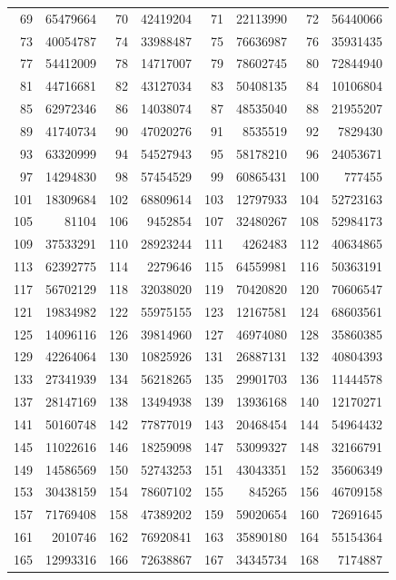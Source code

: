 \begin{longtable}{|r|r|r|r|r|r|r|r|}
69 & 65479664 & 70 & 42419204 & 71 & 22113990 & 72 & 56440066 \\
73 & 40054787 & 74 & 33988487 & 75 & 76636987 & 76 & 35931435 \\
77 & 54412009 & 78 & 14717007 & 79 & 78602745 & 80 & 72844940 \\
81 & 44716681 & 82 & 43127034 & 83 & 50408135 & 84 & 10106804 \\
85 & 62972346 & 86 & 14038074 & 87 & 48535040 & 88 & 21955207 \\
89 & 41740734 & 90 & 47020276 & 91 & 8535519 & 92 & 7829430 \\
93 & 63320999 & 94 & 54527943 & 95 & 58178210 & 96 & 24053671 \\
97 & 14294830 & 98 & 57454529 & 99 & 60865431 & 100 & 777455 \\
101 & 18309684 & 102 & 68809614 & 103 & 12797933 & 104 & 52723163 \\
105 & 81104 & 106 & 9452854 & 107 & 32480267 & 108 & 52984173 \\
109 & 37533291 & 110 & 28923244 & 111 & 4262483 & 112 & 40634865 \\
113 & 62392775 & 114 & 2279646 & 115 & 64559981 & 116 & 50363191 \\
117 & 56702129 & 118 & 32038020 & 119 & 70420820 & 120 & 70606547 \\
121 & 19834982 & 122 & 55975155 & 123 & 12167581 & 124 & 68603561 \\
125 & 14096116 & 126 & 39814960 & 127 & 46974080 & 128 & 35860385 \\
129 & 42264064 & 130 & 10825926 & 131 & 26887131 & 132 & 40804393 \\
133 & 27341939 & 134 & 56218265 & 135 & 29901703 & 136 & 11444578 \\
137 & 28147169 & 138 & 13494938 & 139 & 13936168 & 140 & 12170271 \\
141 & 50160748 & 142 & 77877019 & 143 & 20468454 & 144 & 54964432 \\
145 & 11022616 & 146 & 18259098 & 147 & 53099327 & 148 & 32166791 \\
149 & 14586569 & 150 & 52743253 & 151 & 43043351 & 152 & 35606349 \\
153 & 30438159 & 154 & 78607102 & 155 & 845265 & 156 & 46709158 \\
157 & 71769408 & 158 & 47389202 & 159 & 59020654 & 160 & 72691645 \\
161 & 2010746 & 162 & 76920841 & 163 & 35890180 & 164 & 55154364 \\
165 & 12993316 & 166 & 72638867 & 167 & 34345734 & 168 & 7174887 \\

\end{longtable}
